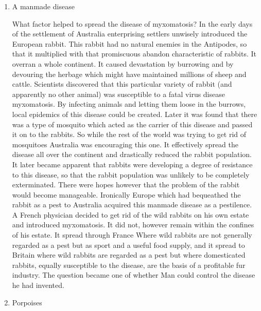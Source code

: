 \begin{enumerate}
\item         A manmade disease

What factor helped to spread the disease of myxomatosis? In the early days of the settlement of Australia enterprising settlers unwisely introduced the European rabbit.
This rabbit had no natural enemies in the Antipodes, so that it multiplied with that promiscuous abandon characteristic of rabbits.
It overran a whole continent.
It caused devastation by burrowing and by devouring the herbage which might have maintained millions of sheep and cattle.
Scientists discovered that this particular variety of rabbit (and apparently no other animal) was susceptible to a fatal virus disease myxomatosis.
By infecting animals and letting them loose in the burrows, local epidemics of this disease could be created.
Later it was found that there was a type of mosquito which acted as the carrier of this disease and passed it on to the rabbits.
So while the rest of the world was trying to get rid of mosquitoes Australia was encouraging this one.
It effectively spread the disease all over the continent and drastically reduced the rabbit population.
It later became apparent that rabbits were developing a degree of resistance to this disease, so that the rabbit population was unlikely to be completely exterminated.
There were hopes however that the problem of the rabbit would become manageable.
Ironically Europe which had bequeathed the rabbit as a pest to Australia acquired this manmade disease as a pestilence.
A French physician decided to get rid of the wild rabbits on his own estate and introduced myxomatosis.
It did not, however remain within the confines of his estate.
It spread through France Where wild rabbits are not generally regarded as a pest but as sport and a useful food supply, and it spread to Britain where wild rabbits are regarded as a pest but where domesticated rabbits, equally susceptible to the disease, are the basis of a profitable fur industry.
The question became one of whether Man could control the disease he had invented.

\item Porpoises


\end{enumerate}
